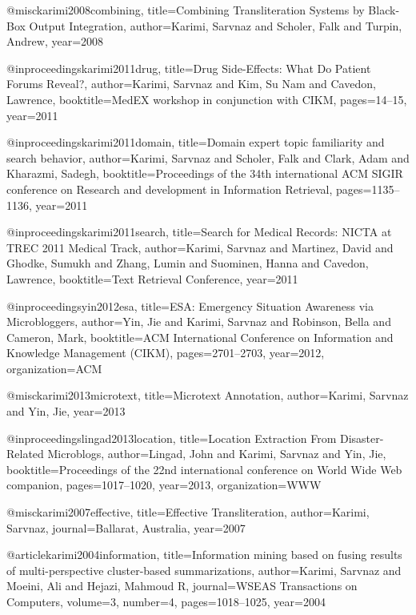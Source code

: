 @misc{karimi2008combining,
  title={Combining Transliteration Systems by Black-Box Output Integration},
  author={Karimi, Sarvnaz and Scholer, Falk and Turpin, Andrew},
  year={2008}
}

@inproceedings{karimi2011drug,
  title={Drug Side-Effects: What Do Patient Forums Reveal?},
  author={Karimi, Sarvnaz and Kim, Su Nam and Cavedon, Lawrence},
  booktitle={MedEX workshop in conjunction with CIKM},
  pages={14--15},
  year={2011}
}

@inproceedings{karimi2011domain,
  title={Domain expert topic familiarity and search behavior},
  author={Karimi, Sarvnaz and Scholer, Falk and Clark, Adam and Kharazmi, Sadegh},
  booktitle={Proceedings of the 34th international ACM SIGIR conference on Research and development in Information Retrieval},
  pages={1135--1136},
  year={2011}
}

@inproceedings{karimi2011search,
  title={Search for Medical Records: NICTA at TREC 2011 Medical Track},
  author={Karimi, Sarvnaz and Martinez, David and Ghodke, Sumukh and Zhang, Lumin and Suominen, Hanna and Cavedon, Lawrence},
  booktitle={Text Retrieval Conference},
  year={2011}
}

@inproceedings{yin2012esa,
  title={ESA: Emergency Situation Awareness via Microbloggers},
  author={Yin, Jie and Karimi, Sarvnaz and Robinson, Bella and Cameron, Mark},
  booktitle={ACM International Conference on Information and Knowledge Management (CIKM)},
  pages={2701--2703},
  year={2012},
  organization={ACM}
}

@misc{karimi2013microtext,
  title={Microtext Annotation},
  author={Karimi, Sarvnaz and Yin, Jie},
  year={2013}
}

@inproceedings{lingad2013location,
  title={Location Extraction From Disaster-Related Microblogs},
  author={Lingad, John and Karimi, Sarvnaz and Yin, Jie},
  booktitle={Proceedings of the 22nd international conference on World Wide Web companion},
  pages={1017--1020},
  year={2013},
  organization={WWW}
}

@misc{karimi2007effective,
  title={Effective Transliteration},
  author={Karimi, Sarvnaz},
  journal={Ballarat, Australia},
  year={2007}
}

@article{karimi2004information,
  title={Information mining based on fusing results of multi-perspective cluster-based summarizations},
  author={Karimi, Sarvnaz and Moeini, Ali and Hejazi, Mahmoud R},
  journal={WSEAS Transactions on Computers},
  volume={3},
  number={4},
  pages={1018--1025},
  year={2004}
}

